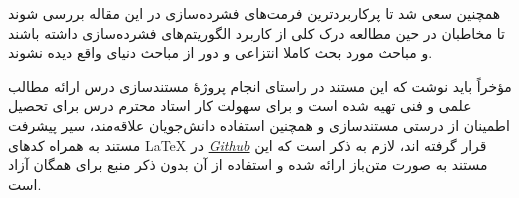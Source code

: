 همچنین سعی شد تا پرکاربردترین فرمت‌های فشرده‌سازی در این مقاله بررسی شوند تا مخاطبان در حین مطالعه درک کلی از کاربرد 
الگوریتم‌های فشرده‌سازی داشته باشند و مباحث مورد بحث کاملا انتزاعی و دور از مباحث دنیای واقع دیده نشوند. 

مؤخراً باید نوشت که این مستند در راستای انجام پروژهٔ مستند‌سازی درس ارائه مطالب علمی و فنی تهیه شده است و 
برای سهولت کار استاد محترم درس برای تحصیل اطمینان از درستی مستندسازی و همچنین استفاده دانش‌جویان علاقه‌مند، سیر پیشرفت مستند به همراه کدهای
  	\LaTeX  \space
  در 
\textit{  \href{https://github.com/merfanian/DataCompressionDoc}{Github} 
}  قرار گرفته اند، لازم به ذکر است که این مستند به صورت متن‌باز ارائه شده و 
استفاده از آن بدون ذکر منبع برای همگان آزاد است. \\